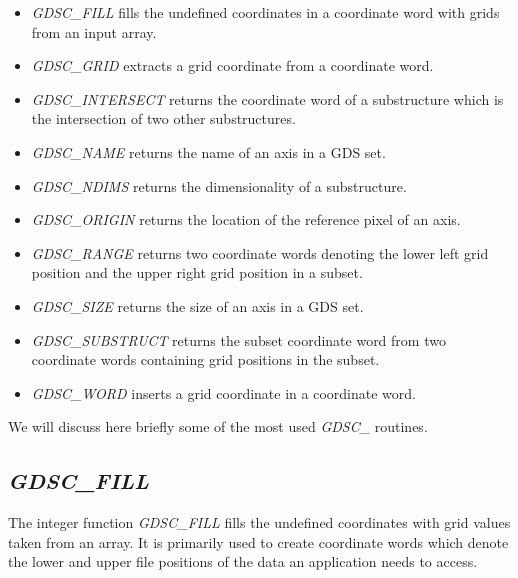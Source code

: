 \begin{itemize}

\item {\sl GDSC\_FILL\/} fills the undefined
coordinates in a coordinate word with grids from an input array.

\item {\sl GDSC\_GRID\/} extracts a grid
coordinate from a coordinate word.

\item {\sl GDSC\_INTERSECT\/} returns the
coordinate word of a substructure which is the intersection of two other
substructures.

\item {\sl GDSC\_NAME\/} returns the name of an
axis in a GDS set.

\item {\sl GDSC\_NDIMS\/} returns the
dimensionality of a substructure.

\item {\sl GDSC\_ORIGIN\/} returns the
location of the reference pixel of an axis.

\item {\sl GDSC\_RANGE\/} returns two
coordinate words denoting the lower left grid position and the upper
right grid position in a subset.

\item {\sl GDSC\_SIZE\/} returns the size of an
axis in a GDS set.

\item {\sl GDSC\_SUBSTRUCT\/} returns the
subset coordinate word from two coordinate words containing grid
positions in the subset.

\item {\sl GDSC\_WORD\/} inserts a grid
coordinate in a coordinate word.

\end{itemize}

We will discuss here briefly some of the most used {\sl GDSC\_\/}
routines.

\subsection{\sl GDSC\_FILL\/}

The integer function {\sl GDSC\_FILL\/} fills the undefined coordinates
with grid values taken from an array. It is primarily used to create
coordinate words which denote the lower and upper file positions of the
data an application needs to access.

